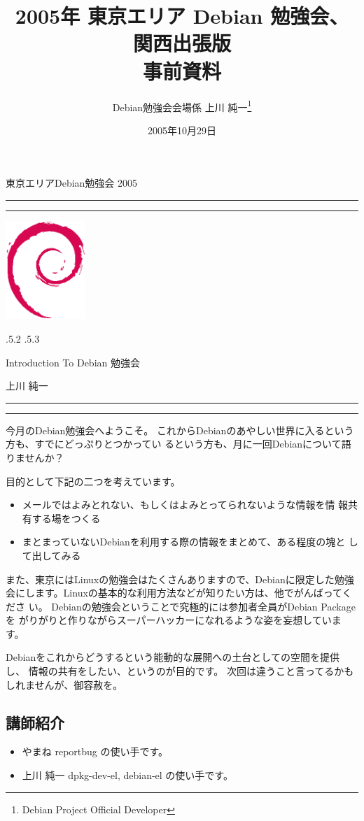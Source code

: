 \documentclass[mingoth,a4paper]{jsarticle}
\makeatletter
\renewcommand{\section}{\@startsection{section}{1}{\z@}%
    {\Cvs \@plus.5\Cdp \@minus.2\Cdp}%
    {.5\Cvs \@plus.3\Cdp}%
    {\normalfont\Large\headfont\raggedright\centering}} %
\newcommand{\dancersection}[2]{%
\newpage
東京エリアDebian勉強会 2005
\hrule
\vspace{0.5mm}
\hrule
\hfill{}\includegraphics[width=3cm]{image200502/openlogo-nd.eps}\\
\vspace{-4cm}
\begin{center}
  \section{#1}
\end{center}
\hfill{}#2\hspace{3cm}\space\\
\hrule
\hrule
\vspace{1cm}
}
\makeatother
\begin{document}
\begin{titlepage}

\title{
2005年 東京エリア Debian 勉強会、関西出張版\\事前資料}
\date{2005年10月29日}
\author{Debian勉強会会場係 上川 純一\thanks{Debian Project Official Developer}} 
\maketitle
\thispagestyle{empty}

\end{titlepage}

\newpage
\tableofcontents

\dancersection{Introduction To Debian 勉強会}{上川 純一}

今月のDebian勉強会へようこそ。
これからDebianのあやしい世界に入るという方も、すでにどっぷりとつかってい
るという方も、月に一回Debianについて語りませんか？

目的として下記の二つを考えています。

\begin{itemize}
 \item メールではよみとれない、もしくはよみとってられないような情報を情
       報共有する場をつくる
 \item まとまっていないDebianを利用する際の情報をまとめて、ある程度の塊と
       して出してみる
\end{itemize}

また、東京にはLinuxの勉強会はたくさんありますので、Debianに限定した勉強
会にします。Linuxの基本的な利用方法などが知りたい方は、他でがんばってくださ
い。
Debianの勉強会ということで究極的には参加者全員がDebian Packageを
がりがりと作りながらスーパーハッカーになれるような姿を妄想しています。

Debianをこれからどうするという能動的な展開への土台としての空間を提供し、
情報の共有をしたい、というのが目的です。
次回は違うこと言ってるかもしれませんが、御容赦を。

\subsection{講師紹介}

\begin{itemize}
 \item{やまね} reportbug の使い手です。
 \item{上川 純一} dpkg-dev-el, debian-el の使い手です。
\end{itemize}
\end{document}
